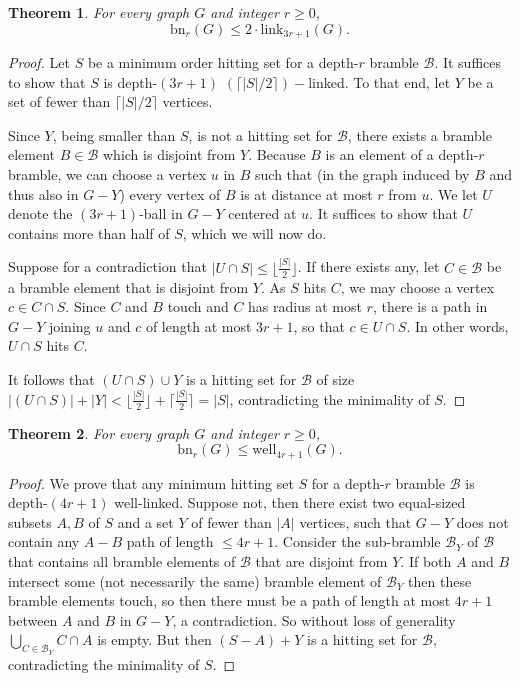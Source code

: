 \documentclass[final]{dmtcs-episciences}
\newtheorem{thm}{Theorem}
\theoremstyle{definition}
\theoremstyle{remark}
\newcommand{\dep}{depth}
\newcommand{\bn}{\ensuremath{\mathrm{bn}}}
\newcommand{\link}{\ensuremath{\mathrm{link}}}
\newcommand{\WL}{\ensuremath{\mathrm{well}}}
\renewcommand{\leq}{\leqslant}
\renewcommand{\geq}{\geqslant}
\begin{document}
\begin{thm}For every graph $G$ and integer $r\geq 0$,
$$\bn_r(G) \leq 2 \cdot \link_{3r+1}(G).$$
\end{thm}
\begin{proof}
Let $S$ be a minimum order hitting set for a \dep-$r$ bramble $\mathcal{B}$. It suffices to show that $S$ is \dep-$(3r+1)$ $(\lceil |S|/2 \rceil)-$linked. To that end, let $Y$ be a set of fewer than $\lceil |S|/2 \rceil$ vertices. 

Since $Y$, being smaller than $S$, is not a hitting set for $\mathcal{B}$, there exists a bramble element $B \in \mathcal{B}$ which is disjoint from $Y$. Because $B$ is an element of a \dep-$r$ bramble, we can choose a vertex $u$ in $B$ such that (in the graph induced by $B$ and thus also in $G-Y$) every vertex of $B$ is at distance at most $r$ from $u$. We let $U$ denote the $(3r+1)$-ball in $G-Y$ centered at $u$. It suffices to show that $U$ contains more than half of $S$, which we will now do.

Suppose for a contradiction that $|U\cap S|\leq \lfloor \frac{|S|}{2} \rfloor$.
If there exists any, let $C\in \mathcal{B}$ be a bramble element that is disjoint from $Y$. As $S$ hits $C$, we may choose a vertex $c \in C \cap S$. Since $C$ and $B$ touch and $C$ has radius at most $r$, there is a path in $G-Y$ joining $u$ and $c$ of length at most $3r+1$, so that $c\in U \cap S$. In other words, $U\cap S$ hits $C$.
 
It follows that $(U\cap S)\cup Y$ is a hitting set for $\mathcal{B}$ of size
$|(U\cap S)|+|Y| < \lfloor \frac{|S|}{2} \rfloor + \lceil \frac{|S|}{2} \rceil = |S|$, contradicting the minimality of $S$.
\end{proof}


\begin{thm}
For every graph $G$ and integer $r\geq 0$,
$$\bn_r(G) \leq \WL_{4r+1}(G).$$
\end{thm}
\begin{proof}
We prove that any minimum hitting set $S$ for a \dep-$r$ bramble $\mathcal{B}$ is \dep-$(4r+1)$ well-linked.
Suppose not, then there exist two equal-sized subsets $A, B$ of $S$ and a set $Y$ of fewer than $|A|$ vertices, such that $G-Y$ does not contain any $A-B$ path of length $\leq 4r+1$.
Consider the sub-bramble $\mathcal{B}_Y$ of $\mathcal{B}$ that contains all bramble elements of $\mathcal{B}$ that are disjoint from $Y$. If both $A$ and $B$ intersect some (not necessarily the same) bramble element of $\mathcal{B}_Y$ then these bramble elements touch, so then there must be a path of length at most $4r+1$ between $A$ and $B$ in $G-Y$, a contradiction. So without loss of generality $\bigcup_{C \in \mathcal{B}_Y} C \cap A$ is empty. But then $(S-A)+Y$ is a hitting set for $\mathcal{B}$, contradicting the minimality of $S$.
\end{proof}
\end{document}

